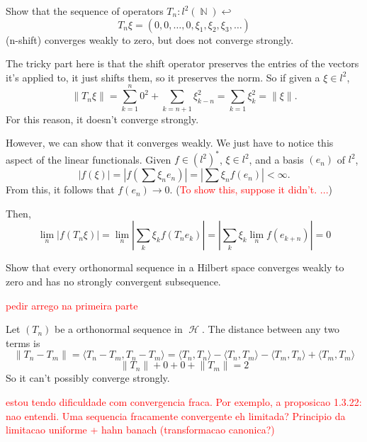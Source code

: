 \documentclass{article}
\theoremstyle{exercisestyle}
\newenvironment{exercise}[1]
  {\renewcommand\theinnerex{#1}\innerex}
  {\endinnerex}
\DeclareMathOperator{\Natural}{\mathbb{N}}
\DeclareMathOperator{\hilbert}{\mathcal{H}}
\newcommand{\norm}[1]{\lVert #1 \rVert}
\newcommand{\inner}[2]{\langle #1, #2 \rangle}
\begin{document}
\begin{exercise}{1.3.19}
    Show that the sequence of operators $T_n : l^2 (\Natural) \hookleftarrow$
    $$ T_n \xi = \left(0, 0, \dots, 0, \xi_{1} , \xi_{2} , \xi_{3}, \dots \right)$$
    (n-shift) converges weakly to zero, but does not converge strongly.

    The tricky part here is that the shift operator preserves the entries of the vectors it's applied to, it just shifts them, so it preserves the norm.
    So if given a $\xi \in l^2$,
    $$ \norm{T_n \xi} = \sum_{k=1}^n 0^2 +  \sum_{k=n+1} \xi_{k-n}^2 = \sum_{k=1}\xi_k^2 = \norm{\xi}.$$
    For this reason, it doesn't converge strongly.

    However, we can show that it converges weakly. We just have to notice this aspect of the linear functionals. Given $f \in (l^2)^*$, $\xi \in l^2$, and a basis $(e_n)$ of $l^2$,
    $$ |f(\xi)| = |f(\sum \xi_n e_n)| = |\sum \xi_n f(e_n)| < \infty.$$
    From this, it follows that $f(e_n) \to 0$. (\textcolor{red}{To show this, suppose it didn't. ...})

    Then,
    $$ \lim_n |f(T_n \xi)| = \lim_n |\sum_k \xi_k f(T_n e_k)| = |\sum_k \xi_k \lim_n f(e_{k+n})| = 0$$


\end{exercise}

\begin{exercise}{1.3.21}
    Show that every orthonormal sequence in a Hilbert space converges weakly to zero and has no strongly convergent subsequence.

    \textcolor{red}{pedir arrego na primeira parte}

    Let $(T_n)$ be a orthonormal sequence in $\hilbert$. The distance between any two terms is
    $$\norm{T_n - T_m} = \inner{T_n - T_m}{T_n - T_m} = \inner{T_n}{T_n} - \inner{T_n}{T_m} - \inner{T_m}{T_n} + \inner{T_m}{T_m}$$
    $$ \norm{T_n} + 0 + 0 + \norm{T_m} = 2$$
    So it can't possibly converge strongly.

    \textcolor{red}{estou tendo dificuldade com convergencia fraca. Por exemplo, a proposicao 1.3.22: nao entendi. Uma sequencia fracamente convergente eh limitada? 
    Principio da limitacao uniforme + hahn banach (transformacao canonica?)}




\end{exercise}
\end{document}
